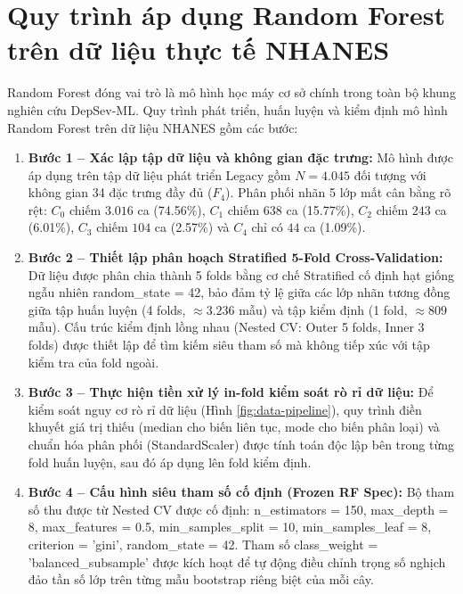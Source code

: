 \section{Quy trình áp dụng Random Forest trên dữ liệu thực tế NHANES}
\label{sec:xay-dung-random-forest}

Random Forest đóng vai trò là mô hình học máy cơ sở chính trong toàn bộ khung nghiên cứu DepSev-ML. Quy trình phát triển, huấn luyện và kiểm định mô hình Random Forest trên dữ liệu NHANES gồm các bước:

\begin{enumerate}
    \item \textbf{Bước 1 -- Xác lập tập dữ liệu và không gian đặc trưng:} 
    Mô hình được áp dụng trên tập dữ liệu phát triển Legacy gồm $N = 4.045$ đối tượng với không gian 34 đặc trưng đầy đủ ($F_4$). Phân phối nhãn 5 lớp mất cân bằng rõ rệt: $C_0$ chiếm $3.016$ ca (74.56\%), $C_1$ chiếm $638$ ca (15.77\%), $C_2$ chiếm $243$ ca (6.01\%), $C_3$ chiếm $104$ ca (2.57\%) và $C_4$ chỉ có $44$ ca (1.09\%).
    
    \item \textbf{Bước 2 -- Thiết lập phân hoạch Stratified 5-Fold Cross-Validation:} 
    Dữ liệu được phân chia thành 5 folds bằng cơ chế Stratified cố định hạt giống ngẫu nhiên \textnormal{random\_state = 42}, bảo đảm tỷ lệ giữa các lớp nhãn tương đồng giữa tập huấn luyện (4 folds, $\approx 3.236$ mẫu) và tập kiểm định (1 fold, $\approx 809$ mẫu). Cấu trúc kiểm định lồng nhau (Nested CV: Outer 5 folds, Inner 3 folds) được thiết lập để tìm kiếm siêu tham số mà không tiếp xúc với tập kiểm tra của fold ngoài.
    
    \item \textbf{Bước 3 -- Thực hiện tiền xử lý in-fold kiểm soát rò rỉ dữ liệu:} 
    Để kiểm soát nguy cơ rò rỉ dữ liệu (Hình \ref{fig:data-pipeline}), quy trình điền khuyết giá trị thiếu (median cho biến liên tục, mode cho biến phân loại) và chuẩn hóa phân phối (StandardScaler) được tính toán độc lập bên trong từng fold huấn luyện, sau đó áp dụng lên fold kiểm định.
    
    \item \textbf{Bước 4 -- Cấu hình siêu tham số cố định (Frozen RF Spec):} 
    Bộ tham số thu được từ Nested CV được cố định: \textnormal{n\_estimators = 150, max\_depth = 8, max\_features = 0.5, min\_samples\_split = 10, min\_samples\_leaf = 8, criterion = 'gini', random\_state = 42}. Tham số \textnormal{class\_weight = 'balanced\_subsample'} được kích hoạt để tự động điều chỉnh trọng số nghịch đảo tần số lớp trên từng mẫu bootstrap riêng biệt của mỗi cây.
    

\end{enumerate}
